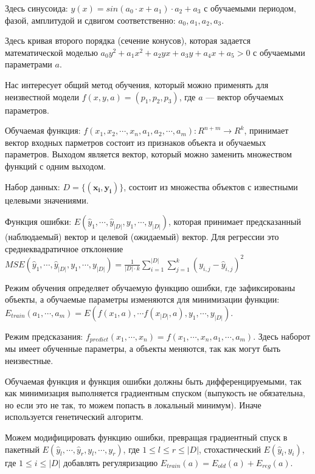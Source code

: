 
Здесь синусоида: $y(x) = sin(a_0 \cdot x + a_1) \cdot a_2 + a_3$ с обучаемыми
периодом, фазой, амплитудой и сдвигом соответственно: $a_0, a_1, a_2, a_3$.


Здесь кривая второго порядка (сечение конусов), которая задается математической
моделью $a_0 y^2 +a_1 x^2 + a_2 yx + a_3 y + a_4 x + a_5 > 0$ с обучаемыми
параметрами $a$.

Нас интересует общий метод обучения, который можно применять для неизвестной
модели $f(x, y, a) = (p_1, p_2, p_3)$, где $a$ --- вектор обучаемых параметров.


Обучаемая функция: $f(x_1, x_2, \cdots, x_n, a_1, a_2, \cdots, a_m) : R^{n+m}
\to R^k$, принимает вектор входных парметров состоит из признаков объекта и
обучаемых параметров. Выходом является вектор, который можно заменить
множеством функций с одним выходом.

Набор данных: $D = \{(\bm{x_i}, \bm{y_i})\}$, состоит из множества объектов с известными
целевыми значениями.

Функция ошибки: $E(\hat y_1, \cdots, \hat y_{|D|}, y_1, \cdots, y_{|D|})$, которая
принимает предсказанный (наблюдаемый) вектор и целевой (ожидаемый) вектор. Для
регрессии это среднеквадратичное отклонение $MSE(\hat y_1, \cdots, \hat
y_{|D|}, y_1, \cdots, y_{|D|}) = \frac{1}{|D| \cdot k} \sum_{i=1}^{|D|}
\sum_{j=1}^k (y_{i,j} - \hat y_{i,j})^2$

Режим обучения определяет обучаемую функцию ошибки, где зафиксированы объекты, а
обучаемые параметры изменяются для минимизации функции: $E_{train} (a_1, \cdots, a_m) = E(f(x_1, a), \cdots f(x_{|D|},
a), y_1, \cdots, y_{|D|})$.

Режим предсказания: $f_{predict} (x_1, \cdots, x_n) = f(x_1, \cdots, x_n, a_1,
\cdots, a_m)$. Здесь наборот мы имеет обученные параметры, а объекты меняются,
так как могут быть неизвестные.

Обучаемая функция и функция ошибки должны быть дифференцируемыми, так как
минимизация выполняется градиентным спуском (выпукость не обязательна, но если
это не так, то можем попасть в локальный минимум). Иначе используется генетический
алгоритм.

Можем модифицировать функцию ошибки, превращая градиентный спуск в
пакетный $E(\hat y_l, \cdots, \hat y_r, y_l, \cdots, y_r)$, где $1 \leq l
\leq r \leq |D|$, стохастический $E(\hat y_i, y_i)$, где $1 \leq i \leq |D|$
добавлять регуляризацию $E_{train}(a) = E_{old}(a) + E_{reg}(a)$.

